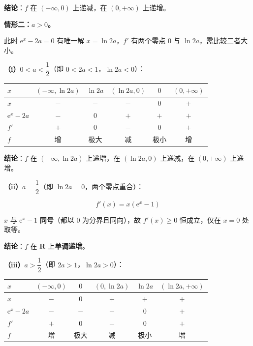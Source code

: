 \begin{answer}
\textbf{结论}：$f$ 在 $(-\infty,0)$ 上递减，在 $(0,+\infty)$ 上递增。

\par\medskip

\textbf{情形二：$a>0$。}

此时 $\mathrm e^{x}-2a=0$ 有唯一解 $x=\ln2a$，$f'$ 有两个零点 $0$ 与 $\ln2a$，需比较二者大小。

\textbf{（i）$0<a<\dfrac12$}（即 $0<2a<1$，$\ln2a<0$）：

\begin{center}
\begin{tabular}{lccccc}
\toprule
$x$ & $(-\infty,\ln2a)$ & $\ln2a$ & $(\ln2a,0)$ & $0$ & $(0,+\infty)$ \\
\midrule
$x$ & $-$ & $-$ & $-$ & $0$ & $+$ \\
$\mathrm e^{x}-2a$ & $-$ & $0$ & $+$ & $+$ & $+$ \\
$f'$ & $+$ & $0$ & $-$ & $0$ & $+$ \\
$f$ & 增 & 极大 & 减 & 极小 & 增 \\
\bottomrule
\end{tabular}
\end{center}

\textbf{结论}：$f$ 在 $(-\infty,\ln2a)$ 上递增，在 $(\ln2a,0)$ 上递减，在 $(0,+\infty)$ 上递增。

\textbf{（ii）$a=\dfrac12$}（即 $\ln2a=0$，两个零点重合）：

\nopagebreak[4]
\[f'(x)=x\left(\mathrm e^{x}-1\right)\]

$x$ 与 $\mathrm e^{x}-1$ \textbf{同号}（都以 $0$ 为分界且同向），故 $f'(x)\ge0$ 恒成立，仅在 $x=0$ 处取等。

\textbf{结论}：$f$ 在 $\mathbf R$ 上\textbf{单调递增}。

\textbf{（iii）$a>\dfrac12$}（即 $2a>1$，$\ln2a>0$）：

\begin{center}
\begin{tabular}{lccccc}
\toprule
$x$ & $(-\infty,0)$ & $0$ & $(0,\ln2a)$ & $\ln2a$ & $(\ln2a,+\infty)$ \\
\midrule
$x$ & $-$ & $0$ & $+$ & $+$ & $+$ \\
$\mathrm e^{x}-2a$ & $-$ & $-$ & $-$ & $0$ & $+$ \\
$f'$ & $+$ & $0$ & $-$ & $0$ & $+$ \\
$f$ & 增 & 极大 & 减 & 极小 & 增 \\
\bottomrule
\end{tabular}
\end{center}


\end{answer}
